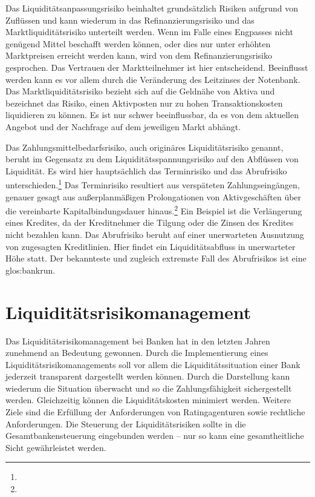 \begin{onehalfspacing}
Das Liquiditätsanpassungsrisiko beinhaltet grundsätzlich Risiken aufgrund von Zuflüssen und kann wiederum in das Refinanzierungsrisiko und das Marktliquiditätsrisiko unterteilt werden. Wenn im Falle eines Engpasses nicht genügend Mittel beschafft werden können, oder dies nur unter erhöhten Marktpreisen erreicht werden kann, wird von dem Refinanzierungsrisiko gesprochen. Das Vertrauen der Marktteilnehmer ist hier entscheidend. Beeinflusst werden kann es vor allem durch die Veränderung des Leitzinses der Notenbank. Das Marktliquiditätsrisiko bezieht sich auf die Geldnähe von Aktiva und bezeichnet das Risiko, einen Aktivposten nur zu hohen Transaktionskosten liquidieren zu können. Es ist nur schwer beeinflussbar, da es von dem aktuellen Angebot und der Nachfrage auf dem jeweiligen Markt abhängt.

Das Zahlungsmittelbedarfsrisiko, auch originäres Liquiditätsrisiko genannt, beruht im Gegensatz zu dem Liquiditätsspannungsrisiko auf den Abflüssen von Liquidität. Es wird hier hauptsächlich das Terminrisiko und das Abrufrisiko unterschieden.\footnote{ } Das Terminrisiko resultiert aus verspäteten Zahlungseingängen, genauer gesagt aus außerplanmäßigen Prolongationen von Aktivgeschäften über die vereinbarte Kapitalbindungsdauer hinaus.\footnote{ } Ein Beispiel ist die Verlängerung eines Kredites, da der Kreditnehmer die Tilgung oder die Zinsen des Kredites nicht bezahlen kann. Das Abrufrisiko beruht auf einer unerwarteten Ausnutzung von zugesagten Kreditlinien. Hier findet ein Liquiditätsabfluss in unerwarteter Höhe statt. Der bekannteste und zugleich extremste Fall des Abrufrisikos ist eine \gls{glos:bankrun}.


\section{Liquiditätsrisikomanagement}
Das Liquiditätsrisikomanagement bei Banken hat in den letzten Jahren zunehmend an Bedeutung gewonnen. Durch die Implementierung eines Liquiditätsrisikomanagements soll vor allem die Liquiditätssituation einer Bank jederzeit transparent dargestellt werden können. Durch die Darstellung kann wiederum die Situation überwacht und so die Zahlungsfähigkeit sichergestellt werden. Gleichzeitig können die Liquiditätskosten minimiert werden. Weitere Ziele sind die Erfüllung der Anforderungen von Ratingagenturen sowie rechtliche Anforderungen. Die Steuerung der Liquiditätsrisiken sollte in die Gesamtbankensteuerung eingebunden werden -- nur so kann eine gesamtheitliche Sicht gewährleistet werden.


\end{onehalfspacing}
